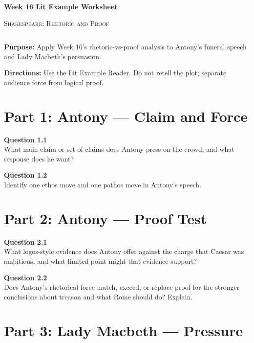 \documentclass[12pt]{article}
\begin{document}
\begin{center}
{\LARGE\bfseries Week 16 Lit Example Worksheet}\par\vspace{0.05em}
{\large\scshape Shakespeare: Rhetoric and Proof}\par\vspace{0.12em}
\rule{0.78\textwidth}{0.5pt}
\end{center}

\textbf{Purpose:} Apply Week 16's rhetoric-vs-proof analysis to Antony's funeral speech and Lady Macbeth's persuasion.

\textbf{Directions:} Use the Lit Example Reader. Do not retell the plot; separate audience force from logical proof.

\section*{Part 1: Antony --- Claim and Force}

\textbf{Question 1.1}\\[-0.15em]
What main claim or set of claims does Antony press on the crowd, and what response does he want?


\textbf{Question 1.2}\\[-0.15em]
Identify one ethos move and one pathos move in Antony's speech.


\newpage

\section*{Part 2: Antony --- Proof Test}

\textbf{Question 2.1}\\[-0.15em]
What logos-style evidence does Antony offer against the charge that Caesar was ambitious, and what limited point might that evidence support?


\textbf{Question 2.2}\\[-0.15em]
Does Antony's rhetorical force match, exceed, or replace proof for the stronger conclusions about treason and what Rome should do? Explain.


\newpage

\section*{Part 3: Lady Macbeth --- Pressure}
\end{document}
